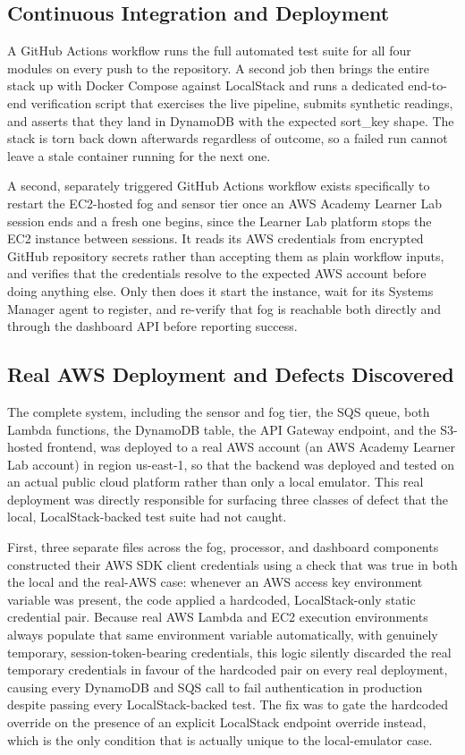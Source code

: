 \documentclass[conference]{IEEEtran}
\begin{document}
\subsection{Continuous Integration and Deployment}
A GitHub Actions workflow runs the full automated test suite for all four modules on every push to the repository. A second job then brings the entire stack up with Docker Compose against LocalStack and runs a dedicated end-to-end verification script that exercises the live pipeline, submits synthetic readings, and asserts that they land in DynamoDB with the expected sort\_key shape. The stack is torn back down afterwards regardless of outcome, so a failed run cannot leave a stale container running for the next one.

A second, separately triggered GitHub Actions workflow exists specifically to restart the EC2-hosted fog and sensor tier once an AWS Academy Learner Lab session ends and a fresh one begins, since the Learner Lab platform stops the EC2 instance between sessions. It reads its AWS credentials from encrypted GitHub repository secrets rather than accepting them as plain workflow inputs, and verifies that the credentials resolve to the expected AWS account before doing anything else. Only then does it start the instance, wait for its Systems Manager agent to register, and re-verify that fog is reachable both directly and through the dashboard API before reporting success.

\subsection{Real AWS Deployment and Defects Discovered}
The complete system, including the sensor and fog tier, the SQS queue, both Lambda functions, the DynamoDB table, the API Gateway endpoint, and the S3-hosted frontend, was deployed to a real AWS account (an AWS Academy Learner Lab account) in region us-east-1, so that the backend was deployed and tested on an actual public cloud platform rather than only a local emulator. This real deployment was directly responsible for surfacing three classes of defect that the local, LocalStack-backed test suite had not caught.

First, three separate files across the fog, processor, and dashboard components constructed their AWS SDK client credentials using a check that was true in both the local and the real-AWS case: whenever an AWS access key environment variable was present, the code applied a hardcoded, LocalStack-only static credential pair. Because real AWS Lambda and EC2 execution environments always populate that same environment variable automatically, with genuinely temporary, session-token-bearing credentials, this logic silently discarded the real temporary credentials in favour of the hardcoded pair on every real deployment, causing every DynamoDB and SQS call to fail authentication in production despite passing every LocalStack-backed test. The fix was to gate the hardcoded override on the presence of an explicit LocalStack endpoint override instead, which is the only condition that is actually unique to the local-emulator case.
\end{document}
